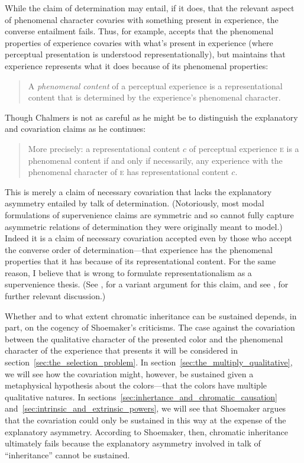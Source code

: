 \documentclass[12pt]{article}
\begin{document}
While the claim of determination may entail, if it does, that the relevant aspect of phenomenal character covaries with something present in experience, the converse entailment fails. Thus, for example, \citet{Chalmers:2006kx} accepts that the phenomenal properties of experience covaries with what's present in experience (where perceptual presentation is understood representationally), but maintains that experience represents what it does because of its phenomenal properties: 
\begin{quote}
	A \emph{phenomenal content} of a perceptual experience is a representational content that is determined by the experience's phenomenal character. \citep[50]{Chalmers:2006kx} 
\end{quote}
Though Chalmers is not as careful as he might be to distinguish the explanatory and covariation claims as he continues: 
\begin{quote}
	More precisely: a representational content $c$ of perceptual experience \textsc{e} is a phenomenal content if and only if necessarily, any experience with the phenomenal character of \textsc{e} has representational content $c$. \citep[50]{Chalmers:2006kx} 
\end{quote}
This is merely a claim of necessary covariation that lacks the explanatory asymmetry entailed by talk of determination. (Notoriously, most modal formulations of supervenience claims are symmetric and so cannot fully capture asymmetric relations of determination they were originally meant to model.) Indeed it is a claim of necessary covariation accepted even by those who accept the converse order of determination---that experience has the phenomenal properties that it has because of its representational content. For the same reason, I believe that \citet{Byrne:2001dq} is wrong to formulate representationalism as a supervenience thesis. (See \citealp{Hilbert:2000on}, for a variant argument for this claim, and see \citealp{Martin:2002cr}, for further relevant discussion.)

Whether and to what extent chromatic inheritance can be sustained depends, in part, on the cogency of Shoemaker's criticisms. The case against the covariation between the qualitative character of the presented color and the phenomenal character of the experience that presents it will be considered in section~\ref{sec:the_selection_problem}. In section~\ref{sec:the_multiply_qualitative}, we will see how the covariation might, however, be sustained given a metaphysical hypothesis about the colors---that the colors have multiple qualitative natures. In sections~\ref{sec:inhertance_and_chromatic_causation} and~\ref{sec:intrinsic_and_extrinsic_powers}, we will see that Shoemaker argues that the covariation could only be sustained in this way at the expense of the explanatory asymmetry. According to Shoemaker, then, chromatic inheritance ultimately fails because the explanatory asymmetry involved in talk of ``inheritance'' cannot be sustained. 
\end{document}
